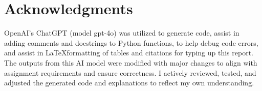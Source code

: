 \documentclass[11pt,a4paper]{article}
\begin{document}
\section{Acknowledgments}

OpenAI's ChatGPT (model gpt-4o) was utilized to generate code, assist in adding comments and docstrings to Python functions, to help debug code errors, and assist in \LaTeX formatting of tables and citations for typing up this report. The outputs from this AI model were modified with major changes to align with assignment requirements and ensure correctness. I actively reviewed, tested, and adjusted the generated code and explanations to reflect my own understanding.




\end{document}
